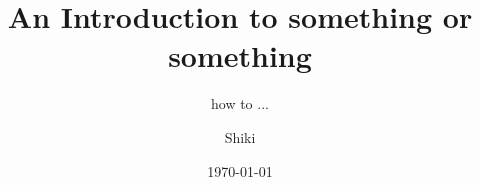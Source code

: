 \documentclass[20pt, fontset=none]{beamer}
\title{An Introduction to something or something}
\subtitle{how to ...}
\author{Shiki \inst{1}}
\institute{\inst{1} where are you from}
\date{\today}
\begin{document}
  \begin{sloppypar}
  
  
  
  
  
  
  \end{sloppypar}
\end{document}
